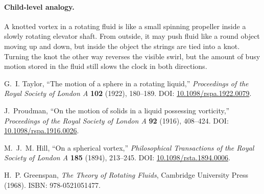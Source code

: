 \paragraph{Child-level analogy.}
A knotted vortex in a rotating fluid is like a small spinning propeller inside a
slowly rotating elevator shaft.  From outside, it may push fluid like a round
object moving up and down, but inside the object the strings are tied into a
knot.  Turning the knot the other way reverses the visible swirl, but the amount
of busy motion stored in the fluid still slows the clock in both directions.


G.~I. Taylor,
``The motion of a sphere in a rotating liquid,''
\emph{Proceedings of the Royal Society of London A} \textbf{102} (1922), 180--189.
DOI: \href{https://doi.org/10.1098/rspa.1922.0079}{10.1098/rspa.1922.0079}.

J.~Proudman,
``On the motion of solids in a liquid possessing vorticity,''
\emph{Proceedings of the Royal Society of London A} \textbf{92} (1916), 408--424.
DOI: \href{https://doi.org/10.1098/rspa.1916.0026}{10.1098/rspa.1916.0026}.

M.~J.~M. Hill,
``On a spherical vortex,''
\emph{Philosophical Transactions of the Royal Society of London A} \textbf{185} (1894), 213--245.
DOI: \href{https://doi.org/10.1098/rsta.1894.0006}{10.1098/rsta.1894.0006}.

H.~P. Greenspan,
\emph{The Theory of Rotating Fluids},
Cambridge University Press (1968).
ISBN: 978-0521051477.

